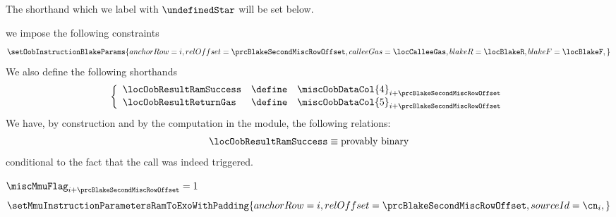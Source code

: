 \begin{description}
\begin{description}
				\saNote{}
				The shorthand \locOobResultRamSuccess{} which we label with $\undefinedStar$ will be set below.
			\item[\underline{Setting \oobMod{} values and shorthands:}] 
				we impose the following constraints
				\[
					\setOobInstructionBlakeParams {
						anchorRow   = i                            ,
						relOffset   = \prcBlakeSecondMiscRowOffset ,
						calleeGas   = \locCalleeGas                ,
						blakeR      = \locBlakeR                   ,
						blakeF      = \locBlakeF                   ,
					}
					\label{hub: instruction handling: call: precompiles: blake: hub success call}
				\]
				We also define the following shorthands
				\[
					\left\{ \begin{array}{lcl} \label{hub: instruction handling: call: precompiles: blake: shorthands}
						\locOobResultRamSuccess      & \define & \miscOobDataCol{4}_{i + \prcBlakeSecondMiscRowOffset} \\
						\locOobResultReturnGas       & \define & \miscOobDataCol{5}_{i + \prcBlakeSecondMiscRowOffset} \\
					\end{array} \right.
				\]
				\saNote{}
				We have, by construction and by the computation in the \oobMod{} module, the following relations:
				\[
					\locOobResultRamSuccess \equiv \text{provably binary} 
				\]
				conditional to the fact that the \oobMod{} call was indeed triggered.
			\item[\underline{Setting \mmuMod{} values:}]
				\If $\miscMmuFlag_{i + \prcBlakeSecondMiscRowOffset} = 1$ \Then
				\[
					\setMmuInstructionParametersRamToExoWithPadding {
						anchorRow       = i                                ,
						relOffset       = \prcBlakeSecondMiscRowOffset     ,
						sourceId        = \cn_{i}                          ,
}\]
\end{description}
\end{description}
